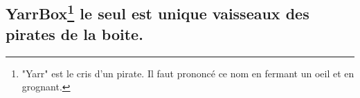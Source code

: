 \documentclass[11pt, a4paper ]{article}
\let\stdsection\section
\renewcommand\section{\newpage\stdsection}
\begin{document}
\begin{spacing}{1.5}




















	



	\section{YarrBox\footnote{"Yarr" est le cris d'un pirate. Il faut prononcé ce nom en fermant un oeil et en grognant.} le seul est unique vaisseaux des pirates de la boite.} %



\end{spacing}
\end{document}
